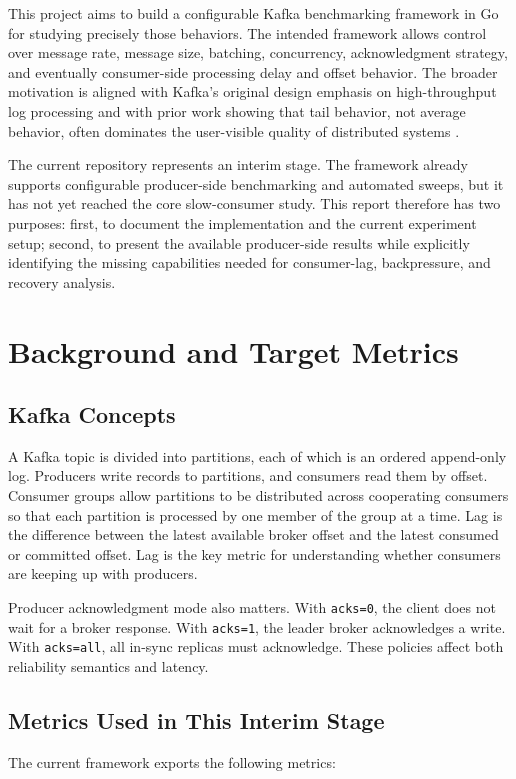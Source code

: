 \documentclass[conference]{IEEEtran}
\begin{document}
This project aims to build a configurable Kafka benchmarking framework in Go for studying precisely those behaviors. The intended framework allows control over message rate, message size, batching, concurrency, acknowledgment strategy, and eventually consumer-side processing delay and offset behavior. The broader motivation is aligned with Kafka's original design emphasis on high-throughput log processing \cite{kreps2011kafka} and with prior work showing that tail behavior, not average behavior, often dominates the user-visible quality of distributed systems \cite{dean2013tail}.

The current repository represents an interim stage. The framework already supports configurable producer-side benchmarking and automated sweeps, but it has not yet reached the core slow-consumer study. This report therefore has two purposes: first, to document the implementation and the current experiment setup; second, to present the available producer-side results while explicitly identifying the missing capabilities needed for consumer-lag, backpressure, and recovery analysis.

\section{Background and Target Metrics}
\subsection{Kafka Concepts}
A Kafka topic is divided into partitions, each of which is an ordered append-only log. Producers write records to partitions, and consumers read them by offset. Consumer groups allow partitions to be distributed across cooperating consumers so that each partition is processed by one member of the group at a time. Lag is the difference between the latest available broker offset and the latest consumed or committed offset. Lag is the key metric for understanding whether consumers are keeping up with producers.

Producer acknowledgment mode also matters. With \texttt{acks=0}, the client does not wait for a broker response. With \texttt{acks=1}, the leader broker acknowledges a write. With \texttt{acks=all}, all in-sync replicas must acknowledge. These policies affect both reliability semantics and latency.

\subsection{Metrics Used in This Interim Stage}
The current framework exports the following metrics:
\end{document}

